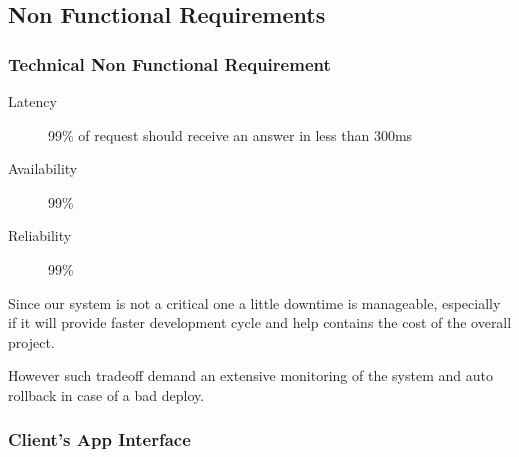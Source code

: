 \documentclass[11pt]{article} %
\begin{document}
\subsection{Non Functional Requirements}

\subsubsection{Technical Non Functional Requirement}

\begin{description}
	\item[Latency] 99\% of request should receive an answer in less than 300ms
	\item[Availability] 99\%
	\item[Reliability] 99\%
\end{description}

Since our system is not a critical one a little downtime is manageable, especially if it will provide faster development cycle and help contains the cost of the overall project. 
 
However such tradeoff demand an extensive monitoring of the system and auto rollback in case of a bad deploy.

\subsubsection{Client's App Interface}
\end{document}

